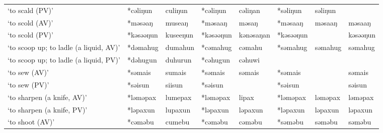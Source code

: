 \begin{landscape}
\begin{longtable}[c]{@{}p{3cm}<{\raggedright}p{2.75cm}<{\raggedright}p{2.75cm}<{\raggedright}p{2.75cm}<{\raggedright}p{2.75cm}<{\raggedright}p{2.75cm}<{\raggedright}p{2.75cm}<{\raggedright}p{2.75cm}<{\raggedright}@{}}
`to scald (PV)'                                      & *cəliŋun           & culiŋun                        & *cəliŋun           & cəliŋan                    & *səliŋun         & səliŋun                  &                                   \\
`to scold (AV)'                                      & *məsəaŋ            & museaŋ                         & *məsaaŋ            & məsaŋ                      & *məsaaŋ          & məsaaŋ                   & məsaaŋ                            \\
`to scold (PV)'                                      & *kəsəəŋun          & kuseeŋun                       & *kəsəəŋun          & kənəsaŋan                  & *kəsəəŋun        &                          & kəsəəŋun                          \\
`to scoop up; to ladle (a liquid, AV)'               & *dəmahug           & dumahun                        & *cəmahug           & cəmahu                     & *səmahug         & səmahug                  & səmahug                           \\
`to scoop up; to ladle (a liquid, PV)'               & *dəhugun           & duhurun                        & *cəhugun           & cəhuwi                     &                  &                          &                                   \\
`to sew (AV)'                                        & *səmais            & sumais                         & *səmais            & səmais                     & *səmais          &                          & səmais                            \\
`to sew (PV)'                                        & *səisun            & siisun                         & *səisun            &                            & *səisun          &                          & səisun                            \\
`to sharpen (a knife, AV)'                           & *ləməpax           & lumepax                        & *ləməpax           & lipax                      & *ləməpax         & ləməpax                  & ləməpax                           \\
`to sharpen (a knife, PV)'                           & *ləpaxun           & lupaxun                        & *ləpaxun           & ləpaxun                    & *ləpaxun         & ləpaxun                  & ləpaxun                           \\
`to shoot (AV)'                                      & *cəməbu            & cumebu                         & *cəməbu            & cəməbu                     & *səməbu          & səməbu                   & səməbu                            \\

\end{longtable}
\end{landscape}
